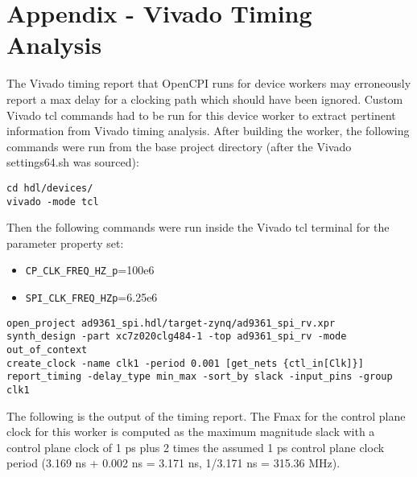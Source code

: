 \documentclass{article}
\begin{document}
\section{Appendix - Vivado Timing Analysis} \label{appendix}

The Vivado timing report that OpenCPI runs for device workers may erroneously report a max delay for a clocking path which should have been ignored. Custom Vivado tcl commands had to be run for this device worker to extract pertinent information from Vivado timing analysis. After building the worker, the following commands were run from the base project directory (after the Vivado settings64.sh was sourced):
\lstset{language=bash, columns=flexible, breaklines=true, prebreak=\textbackslash, basicstyle=\ttfamily, showstringspaces=false,upquote=true, aboveskip=\baselineskip, belowskip=\baselineskip}
\begin{lstlisting}
cd hdl/devices/
vivado -mode tcl
\end{lstlisting}
Then the following commands were run inside the Vivado tcl terminal for the parameter property set:
\begin{itemize}
	\item \verb+CP_CLK_FREQ_HZ_p+=100e6
	\item \verb+SPI_CLK_FREQ_HZp+=6.25e6
\end{itemize}
\begin{lstlisting}
open_project ad9361_spi.hdl/target-zynq/ad9361_spi_rv.xpr
synth_design -part xc7z020clg484-1 -top ad9361_spi_rv -mode out_of_context
create_clock -name clk1 -period 0.001 [get_nets {ctl_in[Clk]}]
report_timing -delay_type min_max -sort_by slack -input_pins -group clk1
\end{lstlisting}
The following is the output of the timing report. The Fmax for the control plane clock for this worker is computed as the maximum magnitude slack with a control plane clock of 1 ps plus 2 times the assumed 1 ps control plane clock period (3.169 ns + 0.002 ns = 3.171 ns, 1/3.171 ns = 315.36 MHz).
\fontsize{6}{12}\selectfont
\end{document}
